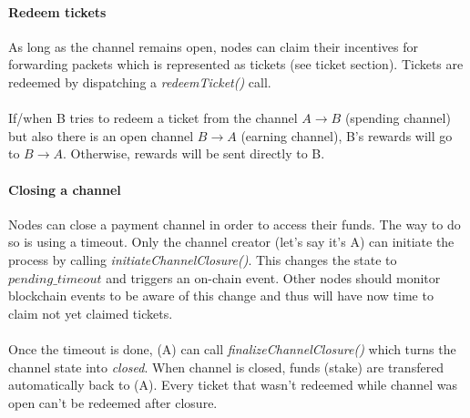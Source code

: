 \paragraph{Redeem tickets}
As long as the channel remains open, nodes can claim their incentives for forwarding packets which is represented as tickets (see ticket section). Tickets are redeemed by dispatching a \textit{redeemTicket()} call. 
\\~\\If/when B tries to redeem a ticket from the channel $A\rightarrow B$ (spending channel) but also there is an open channel $B\rightarrow A$ (earning channel), B's rewards will go to $B\rightarrow A$. Otherwise, rewards will be sent directly to B.
\paragraph{Closing a channel}
Nodes can close a payment channel in order to access their funds. The way to do so is using a timeout.
Only the channel creator (let's say it's A) can initiate the process by calling \textit{initiateChannelClosure()}. This changes the state to $pending\_timeout$ and triggers an on-chain event. Other nodes should monitor blockchain events to be aware of this change and thus will have now time to claim not yet claimed tickets. 
\\~\\Once the timeout is done, (A) can call \textit{finalizeChannelClosure()} which turns the channel state into \textit{closed}. When channel is closed, funds (stake) are transfered automatically back to (A). Every ticket that wasn't redeemed while channel was open can't be redeemed after closure.

\begin{comment}
    

\begin{figure}[H]
    \centering
    \begin{tikzpicture}[looseness=1,auto]
        \path (0,0) node (closed) [ellipse,draw] {$Closed$};
        \path (-1,-1)  node (commitment) [ellipse,draw,align=left] {$Waiting$\\$Commitment$};
        \path (5,0)  node (open) [ellipse,draw] {$Open$};
        \path (2.5,-1)  node (pending) [ellipse,draw,align=left] {$Pending$\\$Timeout$};

        \draw [->,draw](closed) to [bend left] node {\textsf{fund()}} (commitment);
        \draw [->,draw](commitment) to [bend left] node {\textsf{fund()}} (open);
        \draw [->,draw](open) to [bend left] node [align=center] {\textsf{initiateChannelClosure()}} (pending);
        \draw [->,draw](pending) to [bend left] node {\textsf{finalizeChannelClosure()}} (closed);

        \path[->] (open) edge [out=+120,in=+60,distance=2em,below] node [align=center,above] {\textsf{redeemTicket()}}  (open);
    \end{tikzpicture}
    \label{fig:channel workflow}
    \caption{Channel workflow}
\end{figure}
\end{comment}


